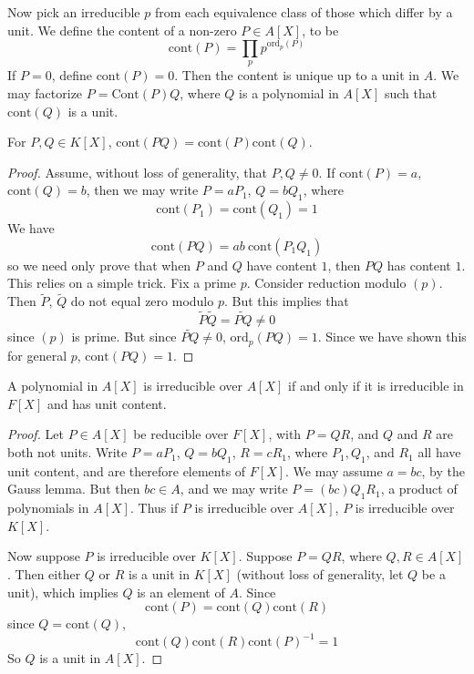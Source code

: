 Now pick an irreducible $p$ from each equivalence class of those which differ by a unit. We define the content of a non-zero $P \in A[X]$, to be
%
\[ \text{cont}(P) = \prod_p p^{\text{ord}_p(P)} \]
%
If $P = 0$, define $\text{cont}(P) = 0$. Then the content is unique up to a unit in $A$. We may factorize $P = \text{Cont}(P)Q$, where $Q$ is a polynomial in $A[X]$ such that $\text{cont}(Q)$ is a unit.

\begin{lemma}[Gauss]
    For $P,Q \in K[X]$, $\text{cont}(PQ) = \text{cont}(P) \text{cont}(Q)$.
\end{lemma}
\begin{proof}
    Assume, without loss of generality, that $P, Q \neq 0$. If $\text{cont}(P) = a$, $\text{cont}(Q) = b$, then we may write $P = a P_1$, $Q = b Q_1$, where
    \[ \text{cont}(P_1) = \text{cont}(Q_1) = 1 \]
    We have
    \[ \text{cont}(PQ) = ab\ \text{cont}(P_1 Q_1) \]
    so we need only prove that when $P$ and $Q$ have content $1$, then $PQ$ has content $1$. This relies on a simple trick. Fix a prime $p$. Consider reduction modulo $(p)$. Then $\tilde{P}$, $\tilde{Q}$ do not equal zero modulo $p$. But this implies that
    \[ \widetilde{P} \widetilde{Q} = \widetilde{PQ} \neq 0 \]
    since $(p)$ is prime. But since $\widetilde{PQ} \neq 0$, $\text{ord}_p(PQ) = 1$. Since we have shown this for general $p$, $\text{cont}(PQ) = 1$.
\end{proof}

\begin{corollary}
    A polynomial in $A[X]$ is irreducible over $A[X]$ if and only if it is irreducible in $F[X]$ and has unit content.
\end{corollary}
\begin{proof}
    Let $P \in A[X]$ be reducible over $F[X]$, with $P = QR$, and $Q$ and $R$ are both not units. Write $P = aP_1$, $Q = bQ_1$, $R = cR_1$, where $P_1, Q_1$, and $R_1$ all have unit content, and are therefore elements of $F[X]$. We may assume $a = bc$, by the Gauss lemma. But then $bc \in A$, and we may write $P = (bc) Q_1 R_1$, a product of polynomials in $A[X]$. Thus if $P$ is irreducible over $A[X]$, $P$ is irreducible over $K[X]$.

    Now suppose $P$ is irreducible over $K[X]$. Suppose $P = QR$, where $Q, R \in A[X]$. Then either $Q$ or $R$ is a unit in $K[X]$ (without loss of generality, let $Q$ be a unit), which implies $Q$ is an element of $A$. Since
    \[ \text{cont}(P) = \text{cont}(Q) \text{cont}(R) \]
    since $Q = \text{cont}(Q)$,
    \[ \text{cont}(Q) \text{cont}(R) \text{cont}(P)^{-1} = 1 \]
    So $Q$ is a unit in $A[X]$.
\end{proof}


